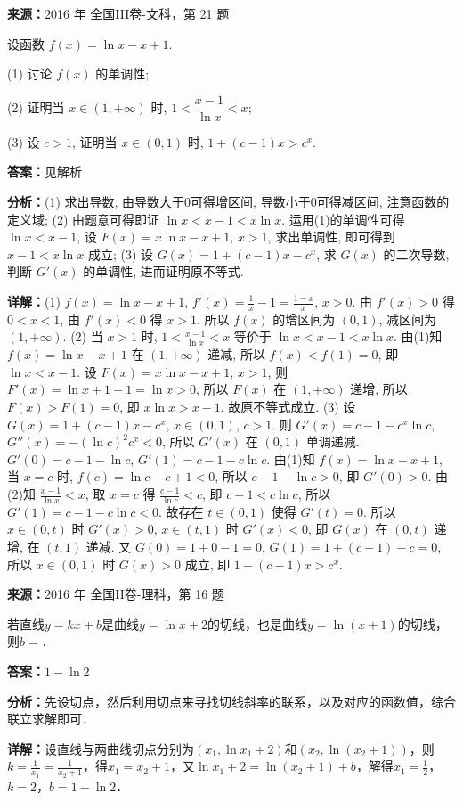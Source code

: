 \begin{question}[points=12]
\textbf{来源：}2016 年 全国III卷-文科，第 21 题\par
设函数 $f(x)=\ln x-x+1$.

(1) 讨论 $f(x)$ 的单调性;

(2) 证明当 $x\in(1,+\infty)$ 时, $1<\dfrac{x-1}{\ln x}<x$;

(3) 设 $c>1$, 证明当 $x\in(0,1)$ 时, $1+(c-1)x>c^x$.
\begin{solution}
\textbf{答案：}见解析

\textbf{分析：}(1) 求出导数, 由导数大于0可得增区间, 导数小于0可得减区间, 注意函数的定义域;
(2) 由题意可得即证 $\ln x<x-1<x\ln x$. 运用(1)的单调性可得 $\ln x<x-1$, 设 $F(x)=x\ln x-x+1$, $x>1$, 求出单调性, 即可得到 $x-1<x\ln x$ 成立;
(3) 设 $G(x)=1+(c-1)x-c^x$, 求 $G(x)$ 的二次导数, 判断 $G'(x)$ 的单调性, 进而证明原不等式.

\textbf{详解：}(1) $f(x)=\ln x-x+1$, $f'(x)=\frac{1}{x}-1=\frac{1-x}{x}$, $x>0$. 由 $f'(x)>0$ 得 $0<x<1$, 由 $f'(x)<0$ 得 $x>1$. 所以 $f(x)$ 的增区间为 $(0,1)$, 减区间为 $(1,+\infty)$.
(2) 当 $x>1$ 时, $1<\frac{x-1}{\ln x}<x$ 等价于 $\ln x<x-1<x\ln x$. 由(1)知 $f(x)=\ln x-x+1$ 在 $(1,+\infty)$ 递减, 所以 $f(x)<f(1)=0$, 即 $\ln x<x-1$. 设 $F(x)=x\ln x-x+1$, $x>1$, 则 $F'(x)=\ln x+1-1=\ln x>0$, 所以 $F(x)$ 在 $(1,+\infty)$ 递增, 所以 $F(x)>F(1)=0$, 即 $x\ln x>x-1$. 故原不等式成立.
(3) 设 $G(x)=1+(c-1)x-c^x$, $x\in(0,1)$, $c>1$. 则 $G'(x)=c-1-c^x\ln c$, $G''(x)=-(\ln c)^2 c^x<0$, 所以 $G'(x)$ 在 $(0,1)$ 单调递减. $G'(0)=c-1-\ln c$, $G'(1)=c-1-c\ln c$. 由(1)知 $f(x)=\ln x-x+1$, 当 $x=c$ 时, $f(c)=\ln c-c+1<0$, 所以 $c-1-\ln c>0$, 即 $G'(0)>0$. 由(2)知 $\frac{x-1}{\ln x}<x$, 取 $x=c$ 得 $\frac{c-1}{\ln c}<c$, 即 $c-1<c\ln c$, 所以 $G'(1)=c-1-c\ln c<0$. 故存在 $t\in(0,1)$ 使得 $G'(t)=0$. 所以 $x\in(0,t)$ 时 $G'(x)>0$, $x\in(t,1)$ 时 $G'(x)<0$, 即 $G(x)$ 在 $(0,t)$ 递增, 在 $(t,1)$ 递减. 又 $G(0)=1+0-1=0$, $G(1)=1+(c-1)-c=0$, 所以 $x\in(0,1)$ 时 $G(x)>0$ 成立, 即 $1+(c-1)x>c^x$.
\end{solution}
\end{question}

\begin{question}[points=5]
\textbf{来源：}2016 年 全国II卷-理科，第 16 题\par
若直线$y=kx+b$是曲线$y=\ln x+2$的切线，也是曲线$y=\ln(x+1)$的切线，则$b=$．
\fillin[{$1-\ln2$}]
\begin{solution}
\textbf{答案：}$1-\ln2$

\textbf{分析：}先设切点，然后利用切点来寻找切线斜率的联系，以及对应的函数值，综合联立求解即可．

\textbf{详解：}设直线与两曲线切点分别为$(x_1,\ln x_1+2)$和$(x_2,\ln(x_2+1))$，则$k=\frac{1}{x_1}=\frac{1}{x_2+1}$，得$x_1=x_2+1$，又$\ln x_1+2=\ln(x_2+1)+b$，解得$x_1=\frac12$，$k=2$，$b=1-\ln2$．
\end{solution}
\end{question}

